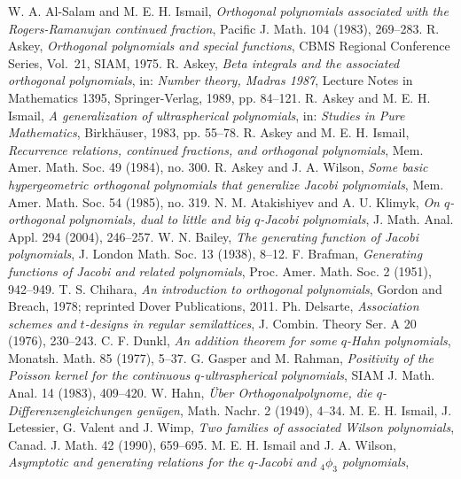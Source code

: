 \documentclass[twoside,11pt]{article}
\newcommand\mybibitemKLS[1]{\bibitem[#1]{#1}\hypertarget{KLS#1}{}}
\begin{document}
\begin{thebibliography}{999}
\label{sec_ref2}
%
\mybibitemKLS{24}
W. A. Al-Salam and M. E. H. Ismail,
{\em Orthogonal polynomials associated with the Rogers-Ramanujan continued fraction},
Pacific J. Math. 104 (1983), 269--283.
%
\mybibitemKLS{46}
R. Askey,
{\em Orthogonal polynomials and special functions},
CBMS Regional Conference Series, Vol.~21, SIAM, 1975.
%
\mybibitemKLS{51}
 R. Askey,
{\em Beta integrals and the associated orthogonal polynomials},
in: {\em Number theory, Madras 1987},
Lecture Notes in Mathematics 1395, Springer-Verlag, 1989,  pp. 84--121.
%
\mybibitemKLS{63}
R. Askey and M. E. H. Ismail,
{\em A generalization of ultraspherical polynomials},
in: {\em Studies in Pure Mathematics},
Birkh\"auser, 1983, pp. 55--78.
%
\mybibitemKLS{64}
R. Askey and M. E. H. Ismail,
{\em Recurrence relations, continued fractions, and orthogonal polynomials},
Mem. Amer. Math. Soc. 49 (1984), no. 300.
%
\mybibitemKLS{72}
R. Askey and J. A. Wilson,
{\em Some basic hypergeometric orthogonal polynomials that generalize Jacobi polynomials},
Mem. Amer. Math. Soc. 54 (1985), no. 319.
%
\mybibitemKLS{79}
N. M. Atakishiyev and A. U. Klimyk,
{\em On $q$-orthogonal polynomials, dual to little and big
$q$-Jacobi polynomials},
J. Math. Anal. Appl. 294 (2004), 246--257.
%
\mybibitemKLS{91}
W. N. Bailey,
{\em The generating function of Jacobi polynomials},
J. London Math. Soc. 13 (1938), 8--12.
%
\mybibitemKLS{109}
F. Brafman,
{\em Generating functions of Jacobi and related polynomials},
Proc. Amer. Math. Soc. 2 (1951), 942--949.
%
\mybibitemKLS{146}
T. S. Chihara,
{\em An introduction to orthogonal polynomials}, Gordon and Breach, 1978;
reprinted Dover Publications, 2011.
%
\mybibitemKLS{161}
Ph. Delsarte, {\em Association schemes and $t$-designs in regular
semilattices}, J. Combin. Theory Ser. A 20 (1976), 230--243.
%
\mybibitemKLS{186}
C. F. Dunkl,
{\em An addition theorem for some $q$-Hahn polynomials},
Monatsh. Math. 85 (1977), 5--37.
%
\mybibitemKLS{234}
G. Gasper and M. Rahman,
{\em Positivity of the Poisson kernel for the continuous
$q$-ultraspherical polynomials},
SIAM J. Math. Anal. 14 (1983), 409--420.
%
\mybibitemKLS{261}
W. Hahn,
{\em \"Uber Orthogonalpolynome, die $q$-Differenzengleichungen gen\"ugen},
Math. Nachr. 2 (1949), 4--34.
%
\mybibitemKLS{281}
M. E. H. Ismail, J. Letessier,  G. Valent and J. Wimp,
{\em Two families of associated Wilson polynomials},
Canad. J. Math. 42 (1990), 659--695.
%
\mybibitemKLS{298}
M. E. H. Ismail and J. A. Wilson,
{\em Asymptotic and generating relations for the $q$-Jacobi and
${}_4 \phi_3$ polynomials},

\end{thebibliography}
\end{document}
